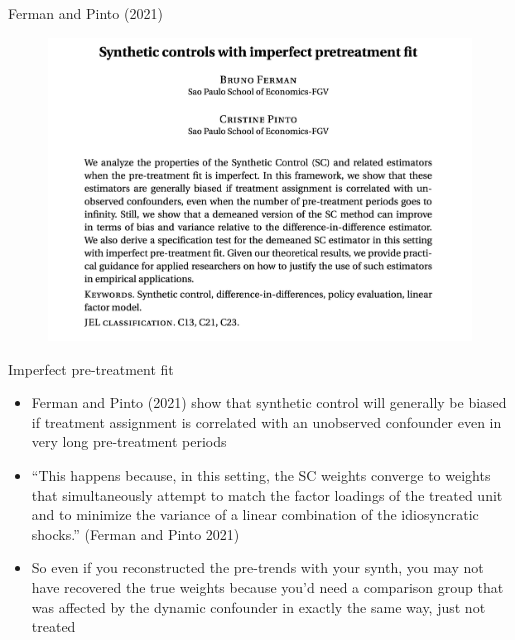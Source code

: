 \documentclass{beamer}
\begin{document}
\begin{frame}{Ferman and Pinto (2021)}

	\begin{figure}
	\includegraphics[scale=0.20]{./lecture_includes/ferman_pinto2021}
	\end{figure}

\end{frame}






\begin{frame}{Imperfect pre-treatment fit }

\begin{itemize}

\item Ferman and Pinto (2021) show that synthetic control will generally be biased if treatment assignment is correlated with an unobserved confounder even in very long pre-treatment periods

\item ``This happens because, in this setting, the SC weights converge to weights that simultaneously attempt to match the factor loadings of the treated unit and to minimize the variance of a linear combination of the idiosyncratic shocks.'' (Ferman and Pinto 2021)

\item So even if you reconstructed the pre-trends with your synth, you may not have recovered the true weights because you'd need a comparison group that was affected by the dynamic confounder in exactly the same way, just not treated

\end{itemize}

\end{frame}
\end{document}

